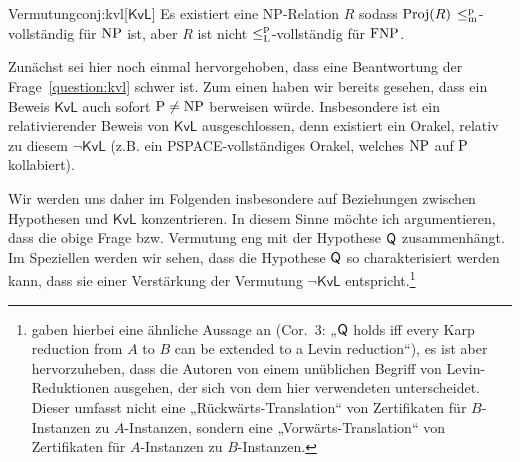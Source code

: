 \begin{reptheorem}{Vermutung}{conj:kvl}[$\mathsf{KvL}$]
    Es existiert eine NP-Relation $R$ sodass $\Proj(R)$ $\leqmp$-vollständig für $\NP$ ist, aber $R$ ist nicht $\leqlp$-vollständig für $\FNP$.
\end{reptheorem}

Zunächst sei hier noch einmal hervorgehoben, dass eine Beantwortung der Frage~\ref{question:kvl} schwer ist. Zum einen haben wir bereits gesehen, dass ein Beweis $\mathsf{KvL}$ auch sofort $\P\neq\NP$ berweisen würde. Insbesondere ist ein relativierender Beweis von $\mathsf{KvL}$ ausgeschlossen, denn existiert ein Orakel, relativ zu diesem $\neg\mathsf{KvL}$ (z.B. ein PSPACE-vollständiges Orakel, welches $\NP$ auf $\P$ kollabiert).

Wir werden uns daher im Folgenden insbesondere auf Beziehungen zwischen Hypothesen und $\mathsf{KvL}$ konzentrieren.
In diesem Sinne möchte ich argumentieren, dass die obige Frage bzw. Vermutung eng mit der Hypothese $\hQ$ zusammenhängt.
Im Speziellen werden wir sehen, dass die Hypothese $\hQ$ so charakterisiert werden kann, dass sie einer Verstärkung der Vermutung $\neg\mathsf{KvL}$ entspricht.\footnote{\textcite{fenner_inverting_2003} gaben hierbei eine ähnliche Aussage an (Cor.~3: „$\hQ$ holds iff every Karp reduction from $A$ to $B$ can be extended to a Levin reduction“), es ist aber hervorzuheben, dass die Autoren von einem unüblichen Begriff von Levin-Reduktionen ausgehen, der sich von dem hier verwendeten unterscheidet. Dieser umfasst nicht eine „Rückwärts-Translation“ von Zertifikaten für $B$-Instanzen zu $A$-Instanzen, sondern eine „Vorwärts-Translation“ von Zertifikaten für $A$-Instanzen zu $B$-Instanzen.}

